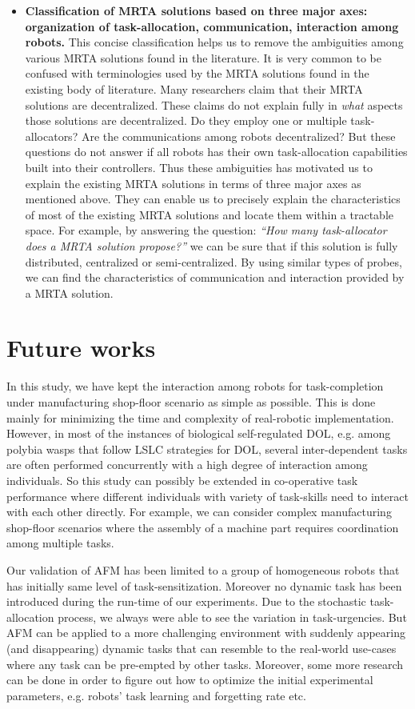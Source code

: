 \begin{itemize}
\item \textbf{Classification of MRTA solutions based on three major axes: organization of task-allocation, communication, interaction among robots.} This concise classification helps us to remove the ambiguities among various MRTA solutions found in the literature.  It is very common to be confused with terminologies used by the MRTA solutions found in the existing body of literature. Many researchers claim that their MRTA solutions are decentralized. These claims do not explain fully in \textit{what} aspects those solutions are decentralized. Do they employ one or multiple task-allocators? Are the communications among robots decentralized? But these questions do not answer if all robots has their own task-allocation capabilities built into their controllers. Thus these ambiguities has motivated us to explain the existing MRTA solutions in terms of three major axes as mentioned above. They can enable us to precisely  explain the characteristics of most of the existing MRTA solutions and locate them within a tractable space. For example, by answering the question: \textit{``How many task-allocator does a MRTA solution propose?''} we can be sure that if this solution is fully distributed, centralized or semi-centralized. By using similar types of probes, we can find the characteristics of communication and interaction provided by a MRTA solution.
\end{itemize}
\section{Future works}
In this study, we have kept the interaction among robots for task-completion under manufacturing shop-floor scenario as simple as possible. This is done mainly for minimizing the time and complexity of real-robotic implementation. However, in most of the instances of biological self-regulated DOL, e.g. among polybia wasps that follow LSLC strategies for DOL, several inter-dependent tasks are often performed concurrently with a high degree of interaction among individuals. So this study can possibly be extended in co-operative task performance where different individuals with variety of task-skills need to interact with each other directly. For example, we can consider complex manufacturing shop-floor scenarios where the assembly of a machine part requires coordination among multiple tasks. 

Our validation of AFM has been limited to a group of homogeneous robots that has initially same level of task-sensitization. Moreover no dynamic task has been introduced during the run-time of our experiments. Due to the stochastic task-allocation process, we always were able to see the  variation in task-urgencies. But AFM can be applied to a more challenging environment with suddenly appearing (and disappearing) dynamic tasks that can resemble to the real-world use-cases where any task can be pre-empted by other tasks. Moreover, some more research can be done in order to figure out how to optimize the initial experimental parameters, e.g. robots' task learning and forgetting rate etc. 

